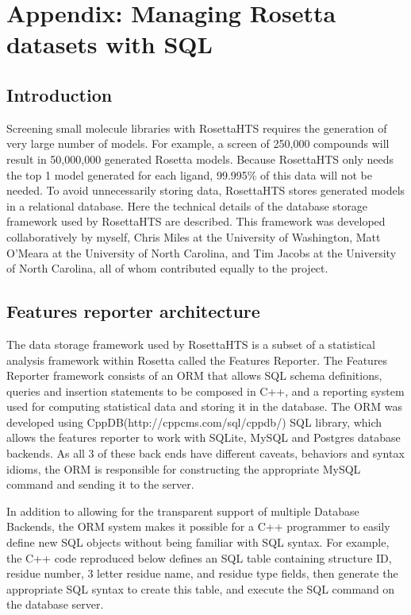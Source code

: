 \chapter{Appendix: Managing Rosetta datasets with SQL}

\section{Introduction}

Screening small molecule libraries with RosettaHTS requires the generation of very large number of models. 
For example, a screen of 250,000 compounds will result in 50,000,000 generated Rosetta models.
Because RosettaHTS only needs the top 1 model generated for each ligand, 99.995\% of this data will not be needed.
To avoid unnecessarily storing data, RosettaHTS stores generated models in a relational database.
Here  the technical details of the database storage framework used by RosettaHTS are described.
This framework was developed collaboratively by myself, Chris Miles at the University of Washington, Matt O'Meara at the University of North Carolina, and Tim Jacobs at the University of North Carolina, all of whom contributed equally to the project. 

\section{Features reporter architecture}

The data storage framework used by RosettaHTS is a subset of a statistical analysis framework within Rosetta called the Features Reporter.
The Features Reporter framework consists of an \ac{ORM} that allows \ac{SQL} schema definitions, queries and insertion statements to be composed in C++, and a reporting system used for computing statistical data and storing it in the database.
The \ac{ORM} was developed using CppDB(http://cppcms.com/sql/cppdb/) \ac{SQL} library, which allows the features reporter to work with SQLite, MySQL and Postgres database backends.
As all 3 of these back ends have different caveats, behaviors and syntax idioms, the \ac{ORM} is responsible for constructing the appropriate MySQL command and sending it to the server.

In addition to allowing for the transparent support of multiple Database Backends, the \ac{ORM} system makes it possible for a C++ programmer to easily define new \ac{SQL} objects without being familiar with \ac{SQL} syntax. 
For example, the C++ code reproduced below defines an \ac{SQL} table containing structure ID, residue number, 3 letter residue name, and residue type fields, then generate the appropriate \ac{SQL} syntax to create this table, and execute the \ac{SQL} command on the database server.

